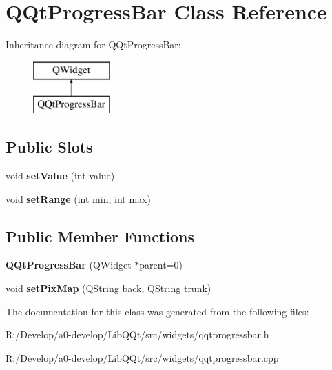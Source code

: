 \hypertarget{class_q_qt_progress_bar}{}\section{Q\+Qt\+Progress\+Bar Class Reference}
\label{class_q_qt_progress_bar}
Inheritance diagram for Q\+Qt\+Progress\+Bar\+:\begin{figure}[H]
\begin{center}
\leavevmode
\includegraphics[height=2.000000cm]{class_q_qt_progress_bar}
\end{center}
\end{figure}
\subsection*{Public Slots}
\begin{DoxyCompactItemize}
\item 
\mbox{\label{class_q_qt_progress_bar_a9e6d946217c6c0b2d4c36c46b0b86057}} 
void {\bfseries set\+Value} (int value)
\item 
\mbox{\label{class_q_qt_progress_bar_a3777570a680e3be4ccbf2210e8f1ef89}} 
void {\bfseries set\+Range} (int min, int max)
\end{DoxyCompactItemize}
\subsection*{Public Member Functions}
\begin{DoxyCompactItemize}
\item 
\mbox{\label{class_q_qt_progress_bar_a218a03c22af943cb157787d5784408f3}} 
{\bfseries Q\+Qt\+Progress\+Bar} (Q\+Widget $\ast$parent=0)
\item 
\mbox{\label{class_q_qt_progress_bar_a0b55964002e8c9cbac7c37f52296d922}} 
void {\bfseries set\+Pix\+Map} (Q\+String back, Q\+String trunk)
\end{DoxyCompactItemize}


The documentation for this class was generated from the following files\+:\begin{DoxyCompactItemize}
\item 
R\+:/\+Develop/a0-\/develop/\+Lib\+Q\+Qt/src/widgets/qqtprogressbar.\+h\item 
R\+:/\+Develop/a0-\/develop/\+Lib\+Q\+Qt/src/widgets/qqtprogressbar.\+cpp\end{DoxyCompactItemize}

